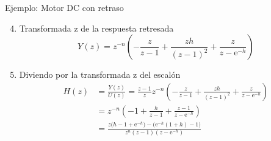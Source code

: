 \documentclass[presentation,aspectratio=169]{beamer}
\begin{document}
\begin{frame}[label={sec:org1961aec}]{Ejemplo: Motor DC con retraso}
\begin{enumerate}
\setcounter{enumi}{3}
\item \alert{Transformada z de la respuesta retresada}
\[ Y(z) = z^{-n} \left(-\frac{z}{z-1} + \frac{zh}{(z-1)^2} + \frac{z}{z-\mathrm{e}^{-h}}\right)\]
\item \alert{Diviendo por la transformada z del escalón} 
\begin{align*}
H(z) &= \frac{Y(z)}{U(z)} = \frac{z-1}{z} z^{-n} \left(-\frac{z}{z-1} + \frac{zh}{(z-1)^2} + \frac{z}{z-\mathrm{e}^{-h}}\right)\\
&= z^{-n} \left( -1 + \frac{h}{z-1} + \frac{z-1}{z-\mathrm{e}^{-h}} \right)\\
&= \frac{ z\big( h-1+\mathrm{e}^{-h}\big) - \big(\mathrm{e}^{-h}(1+h) - 1\big)}{z^n(z-1)(z-\mathrm{e}^{-h})}
\end{align*}
\end{enumerate}
\end{frame}
\end{document}
